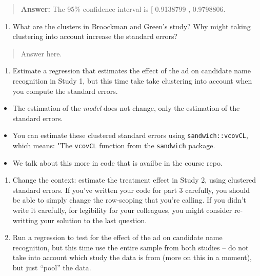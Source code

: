 \documentclass[
]{article}
\providecommand{\tightlist}{%
  \setlength{\itemsep}{0pt}\setlength{\parskip}{0pt}}
\begin{document}
\begin{quote}
\textbf{Answer:} The 95\% confidence interval is {[} 0.9138799 ,
0.9798806.
\end{quote}

\begin{enumerate}
\def\labelenumi{\arabic{enumi}.}
\setcounter{enumi}{1}
\tightlist
\item
  What are the clusters in Broockman and Green's study? Why might taking
  clustering into account increase the standard errors?
\end{enumerate}

\begin{quote}
Answer here.
\end{quote}

\begin{enumerate}
\def\labelenumi{\arabic{enumi}.}
\setcounter{enumi}{2}
\tightlist
\item
  Estimate a regression that estimates the effect of the ad on candidate
  name recognition in Study 1, but this time take take clustering into
  account when you compute the standard errors.
\end{enumerate}

\begin{itemize}
\tightlist
\item
  The estimation of the \emph{model} does not change, only the
  estimation of the standard errors.
\item
  You can estimate these clustered standard errors using
  \texttt{sandwich::vcovCL}, which means: "The \texttt{vcovCL} function
  from the \texttt{sandwich} package.
\item
  We talk about this more in code that is availbe in the course repo.
\end{itemize}

\begin{enumerate}
\def\labelenumi{\arabic{enumi}.}
\setcounter{enumi}{3}
\item
  Change the context: estimate the treatment effect in Study 2, using
  clustered standard errors. If you've written your code for part 3
  carefully, you should be able to simply change the row-scoping that
  you're calling. If you didn't write it carefully, for legibility for
  your colleagues, you might consider re-writting your solution to the
  last question.
\item
  Run a regression to test for the effect of the ad on candidate name
  recognition, but this time use the entire sample from both studies --
  do not take into account which study the data is from (more on this in
  a moment), but just ``pool'' the data.
\end{enumerate}
\end{document}
